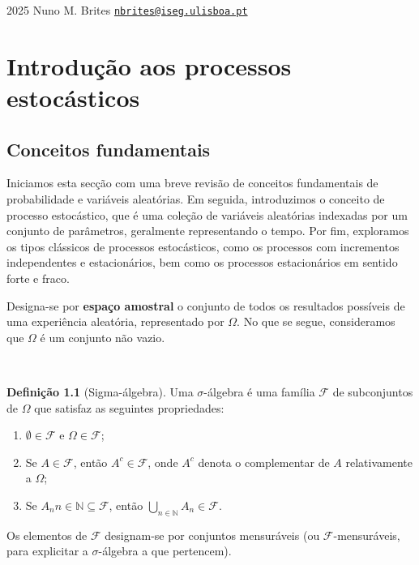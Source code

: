 \documentclass[
  11pt,
  a4paper,
]{book}
\theoremstyle{definition}
\newtheorem{definition}{Definição}[chapter]
\theoremstyle{definition}
\theoremstyle{definition}
\theoremstyle{definition}
\theoremstyle{remark}
\begin{document}
2025 \textbar{} Nuno M. Brites \textbar{}
\href{mailto:nbrites@iseg.ulisboa.pt}{\nolinkurl{nbrites@iseg.ulisboa.pt}}

\chapter{Introdução aos processos estocásticos}\label{introducao-aos-processos-estocasticos}

\section{Conceitos fundamentais}\label{conceitos-fundamentais}

Iniciamos esta secção com uma breve revisão de conceitos fundamentais de probabilidade e variáveis aleatórias. Em seguida, introduzimos o conceito de processo estocástico, que é uma coleção de variáveis aleatórias indexadas por um conjunto de parâmetros, geralmente representando o tempo. Por fim, exploramos os tipos clássicos de processos estocásticos, como os processos com incrementos independentes e estacionários, bem como os processos estacionários em sentido forte e fraco.

Designa-se por \textbf{espaço amostral} o conjunto de todos os resultados possíveis de uma experiência aleatória, representado por \(\Omega\). No que se segue, consideramos que \(\Omega\) é um conjunto não vazio.

\(\,\)

\begin{definition}[Sigma-álgebra]
Uma \(\sigma\)-álgebra é uma família \(\mathcal{F}\) de subconjuntos de \(\Omega\) que satisfaz as seguintes propriedades:

\begin{enumerate}
\def\labelenumi{\roman{enumi})}
\item
  \(\emptyset \in \mathcal{F}\) e \(\Omega \in \mathcal{F}\);
\item
  Se \(A \in \mathcal{F}\), então \(A^c \in \mathcal{F}\), onde \(A^c\) denota o complementar de \(A\) relativamente a \(\Omega\);
\item
  Se \({A_n}{n \in \mathbb{N}} \subseteq \mathcal{F}\), então \(\displaystyle \bigcup_{n \in \mathbb{N}} A_n \in \mathcal{F}\).
\end{enumerate}

Os elementos de \(\mathcal{F}\) designam-se por conjuntos mensuráveis (ou \(\mathcal{F}\)-mensuráveis, para explicitar a \(\sigma\)-álgebra a que pertencem).
\end{definition}
\end{document}
